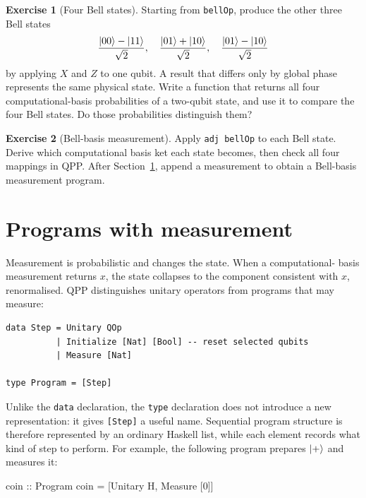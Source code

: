 \documentclass[11pt,a4paper]{article}
\theoremstyle{definition}
\newtheorem{exercise}{Exercise}[section]
\begin{document}
\begin{exercise}[Four Bell states]
Starting from \lstinline|bellOp|, produce the other three Bell states
\[
 \frac{\left| 00 \right\rangle-\left| 11 \right\rangle}{\sqrt2},\quad
 \frac{\left| 01 \right\rangle+\left| 10 \right\rangle}{\sqrt2},\quad
 \frac{\left| 01 \right\rangle-\left| 10 \right\rangle}{\sqrt2}
\]
by applying $X$ and $Z$ to one qubit.  A result that differs only by global
phase represents the same physical state.  Write a function that returns all
four computational-basis probabilities of a two-qubit state, and use it to
compare the four Bell states.  Do those probabilities distinguish them?
\end{exercise}

\begin{exercise}[Bell-basis measurement]
Apply \lstinline|adj bellOp| to each Bell state.  Derive which computational
basis ket each state becomes, then check all four mappings in QPP.  After
Section~\ref{sec:measurement}, append a measurement to obtain a Bell-basis
measurement program.
\end{exercise}

\section{Programs with measurement}
\label{sec:measurement}

Measurement is probabilistic and changes the state.  When a computational-
basis measurement returns $x$, the state collapses to the component
consistent with $x$, renormalised.  QPP distinguishes unitary operators from
programs that may measure:
\begin{lstlisting}
data Step = Unitary QOp
          | Initialize [Nat] [Bool] -- reset selected qubits
          | Measure [Nat]

type Program = [Step]
\end{lstlisting}
Unlike the \lstinline|data| declaration, the \lstinline|type| declaration
does not introduce a new representation: it gives \lstinline|[Step]| a useful
name.  Sequential program structure is therefore represented by an ordinary
Haskell list, while each element records what kind of step to perform.
For example, the following program prepares $\left| + \right\rangle$ and measures it:
\begin{qppcode}
coin :: Program
coin = [Unitary H, Measure [0]]
\end{qppcode}
\end{document}
